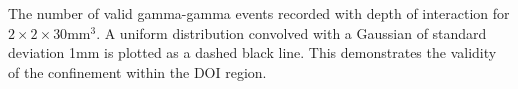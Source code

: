\label{fig:confinement} The number of valid gamma-gamma events recorded with depth of interaction for $2\times2\times30$mm$^3$. A uniform distribution convolved with a Gaussian of standard deviation 1mm is plotted as a dashed black line. This demonstrates the validity of the confinement within the DOI region.